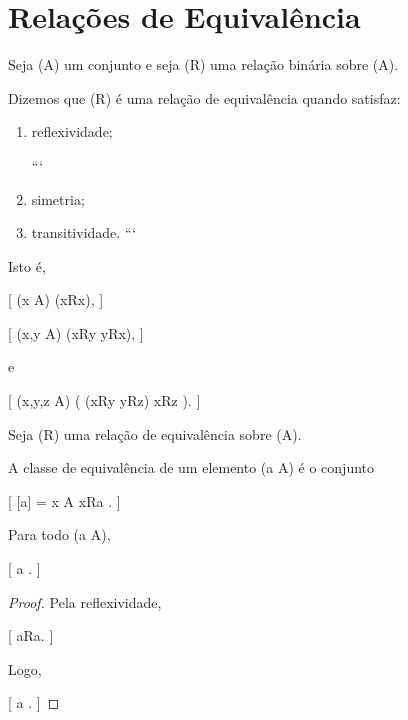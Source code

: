 \documentclass[../../main]{subfiles}
\begin{document}
\section{Relações de Equivalência}
\label{sec:matematica:relacoes:relacoes-de-equivalencia}

\begin{defn}
	\label{def:matematica:relacoes:equivalencia}

	Seja (A) um conjunto e seja (R) uma relação binária sobre (A).

	Dizemos que (R) é uma relação de equivalência quando satisfaz:

	\begin{enumerate}
		\item reflexividade;

		      ```
		\item simetria;

		\item transitividade.
		      ```

	\end{enumerate}

	Isto é,

	[
			(\forall x \in A)
			(xRx),
		]

		[
			(\forall x,y \in A)
			(xRy \Rightarrow yRx),
		]

	e

		[
			(\forall x,y,z \in A)
			\bigl(
			(xRy \land yRz)
			\Rightarrow
			xRz
			\bigr).
		]

\end{defn}

\begin{defn}
	\label{def:matematica:relacoes:classe-equivalencia}

	Seja (R) uma relação de equivalência sobre (A).

	A classe de equivalência de um elemento (a \in A) é o conjunto

		[
			[a]
				=
				{
					x \in A
					\mid
					xRa
				}.
		]

\end{defn}

\begin{prop}
	\label{prop:matematica:relacoes:classe-contem-elemento}

	Para todo (a \in A),

	[
			a \in [a].
		]

\end{prop}

\begin{proof}

	Pela reflexividade,

	[
			aRa.
		]

	Logo,

	[
			a \in [a].
		]

\end{proof}
\end{document}
